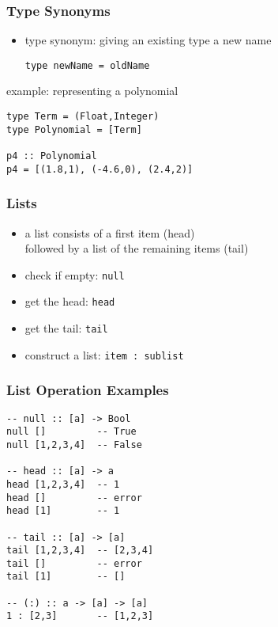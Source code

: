\documentclass[dvipsnames]{beamer}
\theoremstyle{plain}
\begin{document}
\begin{frame}[fragile]
  \frametitle{Type Synonyms}

  \begin{itemize}
    \item type synonym: giving an existing type a new name
    \smallskip
    \begin{lstlisting}
type newName = oldName
    \end{lstlisting}
  \end{itemize}

  \pause
  \begin{exampleblock}{example: representing a polynomial}
    \begin{lstlisting}
type Term = (Float,Integer)
type Polynomial = [Term]

p4 :: Polynomial
p4 = [(1.8,1), (-4.6,0), (2.4,2)]
    \end{lstlisting}
  \end{exampleblock}
\end{frame}

\begin{frame}
  \frametitle{Lists}

  \begin{itemize}
    \item a list consists of a first item (\alert{head})\\
      followed by a list of the remaining items (\alert{tail})

    \medskip
    \item check if empty: \lstinline{null}
    \item get the head: \lstinline{head}
    \item get the tail: \lstinline{tail}
    \item construct a list: \lstinline{item : sublist}
  \end{itemize}
\end{frame}

\begin{frame}[fragile]
  \frametitle{List Operation Examples}

  \begin{lstlisting}
-- null :: [a] -> Bool
null []         -- True
null [1,2,3,4]  -- False

-- head :: [a] -> a
head [1,2,3,4]  -- 1
head []         -- error
head [1]        -- 1

-- tail :: [a] -> [a]
tail [1,2,3,4]  -- [2,3,4]
tail []         -- error
tail [1]        -- []

-- (:) :: a -> [a] -> [a]
1 : [2,3]       -- [1,2,3]
  \end{lstlisting}
\end{frame}
\end{document}
